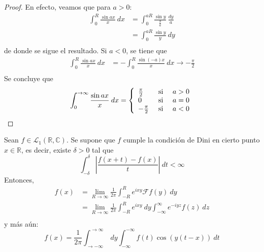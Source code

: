 \documentclass[12pt]{report}
\theoremstyle{largebreak}
\newcommand\abs[1]{\ensuremath{\left|#1\right|}}
\newcommand{\fou}[1]{\ensuremath{\mathcal{F}#1}}
\begin{document}
    \begin{proof}
        En efecto, veamos que para $a>0$:
        \begin{equation*}
            \begin{split}
                \int_0^R\frac{\sin ax}{x}\:dx&=\int_0^{aR}\frac{\sin y}{\frac{y}{a}}\:\frac{dy}{a}\\
                &=\int_0^{aR} \frac{\sin y}{y}\:dy\\
            \end{split}
        \end{equation*}
        de donde se sigue el resultado. Si $a<0$, se tiene que
        \begin{equation*}
            \begin{split}
                \int_0^R\frac{\sin ax}{x}\:dx&=-\int_0^R\frac{\sin (-a)x}{x}\:dx\longrightarrow -\frac{\pi}{2}\\
            \end{split}
        \end{equation*}
        Se concluye que
        \begin{equation*}
            \int_0^{ \rightarrow\infty}\frac{\sin ax}{x}\:dx=\left\{
                \begin{array}{lcr}
                    \frac{\pi}{2} & \textup{ si } & a>0\\
                    0 & \textup{ si } & a=0\\
                    -\frac{\pi}{2} & \textup{ si } & a<0\\
                \end{array}
            \right.
        \end{equation*}
    \end{proof}

    \begin{theor}
        Sean $f\in\mathcal{L}_1(\mathbb{R},\mathbb{C})$. Se supone que $f$ cumple la condición de Dini en cierto punto $x\in\mathbb{R}$, es decir, existe $\delta>0$ tal que
        \begin{equation*}
            \int_{-\delta}^\delta\abs{\frac{f(x+t)-f(x)}{t}}\:dt<\infty
        \end{equation*}
        Entonces,
        \begin{equation*}
            \begin{split}
                f(x)&=\lim_{ R\rightarrow\infty}\frac{1}{2\pi}\int_{ -R}^{ R}e^{ixy}\fou{f}(y)\:dy\\
                &=\lim_{ R\rightarrow\infty}\frac{1}{2\pi}\int_{ -R}^{ R}e^{ixy}\:dy\int_{-\infty}^\infty e^{ -iyz}f(z)\:dz \\
            \end{split}
        \end{equation*}
        y más aún:
        \begin{equation*}
            f(x)=\frac{1}{2\pi}\int_{ \rightarrow-\infty}^{\rightarrow\infty}\:dy\int_{ -\infty}^{ -\infty}f(t)\cos(y(t-x))\:dt
        \end{equation*}
    \end{theor}
    
\end{document}
